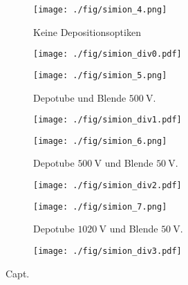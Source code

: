 \begin{figure}
  \begin{subfigure}[h]{0.50\textwidth}
    \texttt{[image: ./fig/simion\_4.png]}
    \caption{Keine Depositionsoptiken}
    \label{fig:div1}
  \end{subfigure}\hfill
  \begin{subfigure}[h]{0.45\textwidth}
    \texttt{[image: ./fig/simion\_div0.pdf]}
    \label{fig:div2}
  \end{subfigure}\hfill
  \begin{subfigure}[h]{0.50\textwidth}
    \texttt{[image: ./fig/simion\_5.png]}
    \caption{Depotube und Blende $\SI{500}{\volt}$.}
    \label{fig:div3}
  \end{subfigure}\hfill
  \begin{subfigure}[h]{0.45\textwidth}
    \texttt{[image: ./fig/simion\_div1.pdf]}
    \label{fig:div4}
  \end{subfigure}\hfill
  \begin{subfigure}[h]{0.50\textwidth}
    \texttt{[image: ./fig/simion\_6.png]}
    \caption{Depotube $\SI{500}{\volt}$ und Blende $\SI{50}{\volt}$.}
    \label{fig:div5}
  \end{subfigure}\hfill
  \begin{subfigure}[h]{0.45\textwidth}
    \texttt{[image: ./fig/simion\_div2.pdf]}
    \label{fig:div6}
  \end{subfigure}\hfill
  \begin{subfigure}[h]{0.50\textwidth}
    \texttt{[image: ./fig/simion\_7.png]}
    \caption{Depotube $\SI{1020}{\volt}$ und Blende $\SI{50}{\volt}$.}
    \label{fig:div7}
  \end{subfigure}\hfill
  \begin{subfigure}[h]{0.45\textwidth}
    \texttt{[image: ./fig/simion\_div3.pdf]}
    \label{fig:div8}
  \end{subfigure}
  \caption{Capt.}
  \label{fig:simion_div}
\end{figure}


